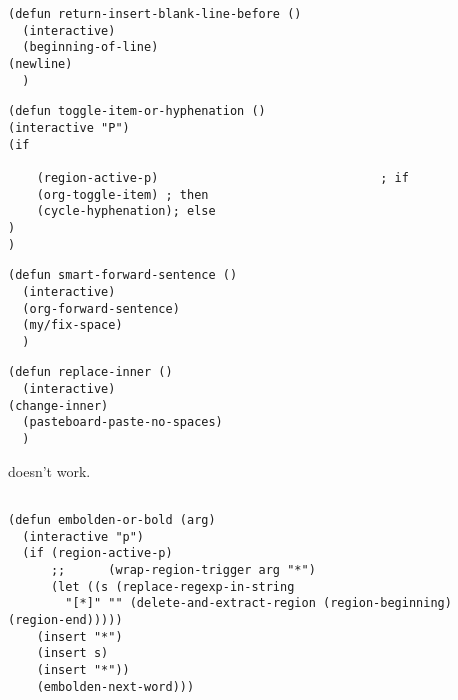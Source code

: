 \documentclass[11pt]{article}
\begin{document}
\begin{verbatim}
(defun return-insert-blank-line-before ()
  (interactive)
  (beginning-of-line)
(newline)
  )
\end{verbatim}

\label{sec:orge91b965}
\begin{verbatim}
(defun toggle-item-or-hyphenation ()
(interactive "P")
(if

    (region-active-p)                               ; if
    (org-toggle-item) ; then
    (cycle-hyphenation); else
)
)
\end{verbatim}

\label{sec:orgac8dca5}
\begin{verbatim}
(defun smart-forward-sentence ()
  (interactive)
  (org-forward-sentence)
  (my/fix-space)
  )
\end{verbatim}
\label{sec:orgefb3c7d}
\begin{verbatim}
(defun replace-inner ()
  (interactive)
(change-inner)
  (pasteboard-paste-no-spaces)
  )
\end{verbatim}

doesn't work.
\label{sec:org6bc9bd6}

\begin{verbatim}

(defun embolden-or-bold (arg)
  (interactive "p")
  (if (region-active-p)
      ;;      (wrap-region-trigger arg "*")
      (let ((s (replace-regexp-in-string
		"[*]" "" (delete-and-extract-region (region-beginning) (region-end)))))
	(insert "*")
	(insert s)
	(insert "*"))
    (embolden-next-word)))

\end{verbatim}
\end{document}

